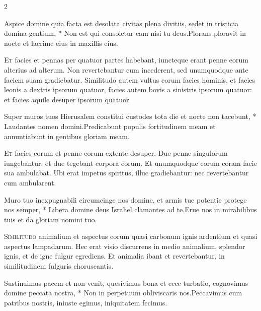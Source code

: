 \begin{multicols*}{2}
\begin{responsory-doxology}
{Aspice domine quia facta est desolata civitas plena divitiis, sedet in tristicia domina gentium, * Non est qui consoletur eam nisi tu deus.}{Plorans ploravit in nocte et lacrime eius in maxillis eius.}
\end{responsory-doxology}%
\lettrine[lines=2]{\zallmancaps \color{Blue} E}{t} facies et pennas per quatuor partes habebant, iuncteque erant penne eorum alterius ad alterum. Non revertebantur cum incederent, sed unumquodque ante faciem suam gradiebatur. Similitudo autem vultus eorum facies hominis, et facies leonis a dextris ipsorum quatuor, facies autem bovis a sinistris ipsorum quatuor: et facies aquile desuper ipsorum quatuor.
\begin{responsory}
{Super muros tuos Hierusalem constitui custodes tota die et nocte non tacebunt, * Laudantes nomen domini.}{Predicabunt populis fortitudinem meam et annuntiabunt in gentibus gloriam meam.}
\end{responsory}%
\lettrine[lines=2]{\zallmancaps \color{Red} E}{t} facies eorum et penne eorum extente desuper. Due penne singulorum iungebantur: et due tegebant corpora eorum. Et unumquodque eorum coram facie sua ambulabat. Ubi erat impetus spiritus, illuc gradiebantur: nec revertebantur cum ambularent.
\begin{responsory}
{Muro tuo inexpugnabili circumcinge nos domine, et armis tue potentie protege nos semper, * Libera domine deus Israhel clamantes ad te.}{Erue nos in mirabilibus tuis et da gloriam nomini tuo.}
\end{responsory}%
\lettrine[lines=2]{\zallmancaps \color{Blue} S}{imilitudo} animalium et aspectus eorum quasi carbonum ignis ardentium et quasi aspectus lampadarum. Hec erat visio discurrens in medio animalium, splendor ignis, et de igne fulgur egrediens. Et animalia ibant et revertebantur, in similitudinem fulguris choruscantis.
\begin{responsory-doxology}
{Sustinuimus pacem et non venit, quesivimus bona et ecce turbatio, cognovimus domine peccata nostra, * Non in perpetuum obliviscaris nos.}{Peccavimus cum patribus nostris, iniuste egimus, iniquitatem fecimus.}
\end{responsory-doxology}%

\end{multicols*}
